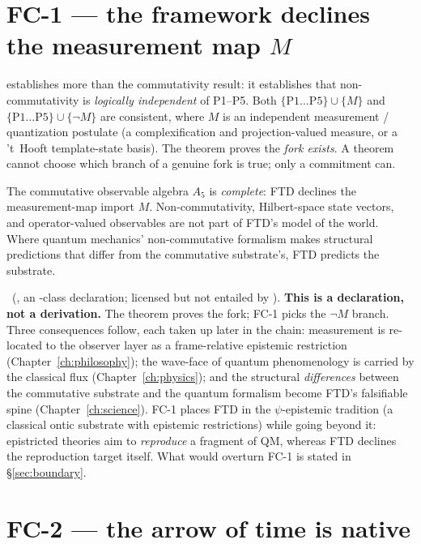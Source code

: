 \section{FC-1 --- the framework declines the measurement map $M$}\label{sec:fc1}

 establishes more than the commutativity result: it establishes that
non-commutativity is \emph{logically independent} of P1--P5. Both
$\{\mathrm{P1\ldots P5}\}\cup\{M\}$ and $\{\mathrm{P1\ldots P5}\}\cup\{\neg M\}$
are consistent, where $M$ is an independent measurement / quantization postulate
(a complexification and projection-valued measure, or a 't~Hooft template-state
basis). The theorem proves the \emph{fork exists}. A theorem cannot choose which
branch of a genuine fork is true; only a commitment can.

\begin{conditionalbox}
The commutative observable algebra $A_5$ is \emph{complete}: FTD declines the
measurement-map import $M$. Non-commutativity, Hilbert-space state vectors, and
operator-valued observables are not part of FTD's model of the world. Where
quantum mechanics' non-commutative formalism makes structural predictions that
differ from the commutative substrate's, FTD predicts the substrate.
\end{conditionalbox}

\noindent
{}~(, an -class declaration; licensed but not entailed
by ). \textbf{This is a declaration, not a derivation.} The theorem
proves the fork; FC-1 picks the $\neg M$ branch. Three consequences follow, each
taken up later in the chain: measurement is re-located to the observer layer as a
frame-relative epistemic restriction (Chapter~\ref{ch:philosophy}); the wave-face
of quantum phenomenology is carried by the classical flux (Chapter~\ref{ch:physics});
and the structural \emph{differences} between the commutative substrate and the
quantum formalism become FTD's falsifiable spine
(Chapter~\ref{ch:science}). FC-1 places FTD in the $\psi$-epistemic tradition (a
classical ontic substrate with epistemic restrictions) while going beyond it:
epistricted theories aim to \emph{reproduce} a fragment of QM, whereas FTD
declines the reproduction target itself. What would overturn FC-1 is stated in
\S\ref{sec:boundary}.

\section{FC-2 --- the arrow of time is native}\label{sec:fc2}

